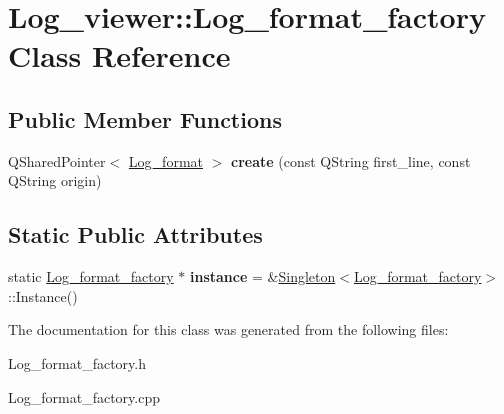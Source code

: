 \hypertarget{class_log__viewer_1_1_log__format__factory}{\section{Log\-\_\-viewer\-:\-:Log\-\_\-format\-\_\-factory Class Reference}
\label{class_log__viewer_1_1_log__format__factory}
}
\subsection*{Public Member Functions}
\begin{DoxyCompactItemize}
\item 
\hypertarget{class_log__viewer_1_1_log__format__factory_a4ef6441f33c9a8b6392dcd7b082addb8}{Q\-Shared\-Pointer$<$ \hyperlink{class_log__viewer_1_1_log__format}{Log\-\_\-format} $>$ {\bfseries create} (const Q\-String first\-\_\-line, const Q\-String origin)}\label{class_log__viewer_1_1_log__format__factory_a4ef6441f33c9a8b6392dcd7b082addb8}

\end{DoxyCompactItemize}
\subsection*{Static Public Attributes}
\begin{DoxyCompactItemize}
\item 
\hypertarget{class_log__viewer_1_1_log__format__factory_a3eadcfd3d62ff681313c8e5809507ed1}{static \hyperlink{class_log__viewer_1_1_log__format__factory}{Log\-\_\-format\-\_\-factory} $\ast$ {\bfseries instance} = \&\hyperlink{class_singleton}{Singleton}$<$\hyperlink{class_log__viewer_1_1_log__format__factory}{Log\-\_\-format\-\_\-factory}$>$\-::Instance()}\label{class_log__viewer_1_1_log__format__factory_a3eadcfd3d62ff681313c8e5809507ed1}

\end{DoxyCompactItemize}


The documentation for this class was generated from the following files\-:\begin{DoxyCompactItemize}
\item 
Log\-\_\-format\-\_\-factory.\-h\item 
Log\-\_\-format\-\_\-factory.\-cpp\end{DoxyCompactItemize}
